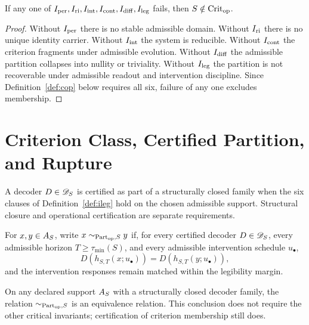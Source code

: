 \begin{proposition}\label{prop:invariant-necessity}
If any one of $I_{\mathrm{per}},\allowbreak I_{\mathrm{ri}},\allowbreak I_{\mathrm{int}},\allowbreak I_{\mathrm{cont}},\allowbreak I_{\mathrm{diff}},\allowbreak I_{\mathrm{leg}}$ fails, then $S\notin\mathrm{Crit}_{\mathrm{op}}$.
\end{proposition}

\begin{proof}
Without $I_{\mathrm{per}}$ there is no stable admissible domain. Without $I_{\mathrm{ri}}$ there is no unique identity carrier. Without $I_{\mathrm{int}}$ the system is reducible. Without $I_{\mathrm{cont}}$ the criterion fragments under admissible evolution. Without $I_{\mathrm{diff}}$ the admissible partition collapses into nullity or triviality. Without $I_{\mathrm{leg}}$ the partition is not recoverable under admissible readout and intervention discipline. Since Definition~\ref{def:cop} below requires all six, failure of any one excludes membership.
\end{proof}

\section{Criterion Class, Certified Partition, and Rupture}

\begin{definition}
A decoder $D\in\mathscr{D}_S$ is certified as part of a structurally closed family when the six clauses of Definition~\ref{def:ileg} hold on the chosen admissible support. Structural closure and operational certification are separate requirements.
\end{definition}

\begin{definition}
For $x,y\in A_S$, write $x\sim_{\mathrm{Part}_{\mathrm{op}},S}y$ if, for every certified decoder $D\in\mathscr{D}_S$, every admissible horizon $T\ge \tau_{\min}(S)$, and every admissible intervention schedule $u_\bullet$,
\[
D(h_{S,T}(x;u_\bullet))=D(h_{S,T}(y;u_\bullet)),
\]
and the intervention responses remain matched within the legibility margin.
\end{definition}

\begin{proposition}\label{prop:qop-welldefined}
On any declared support $A_S$ with a structurally closed decoder family, the relation $\sim_{\mathrm{Part}_{\mathrm{op}},S}$ is an equivalence relation. This conclusion does not require the other critical invariants; certification of criterion membership still does.
\end{proposition}

